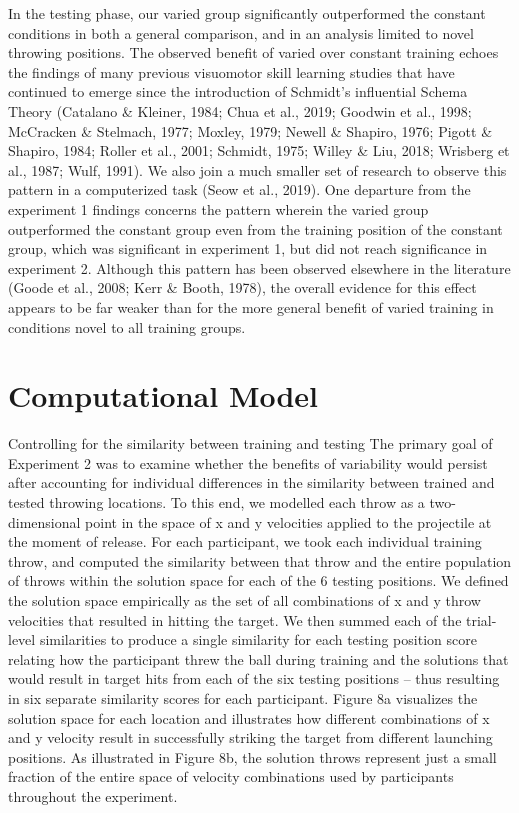 \documentclass[
  man,floatsintext]{apa7}
\begin{document}
In the testing phase, our varied group significantly outperformed the constant conditions in both a general comparison, and in an analysis limited to novel throwing positions. The observed benefit of varied over constant training echoes the findings of many previous visuomotor skill learning studies that have continued to emerge since the introduction of Schmidt's influential Schema Theory (Catalano \& Kleiner, 1984; Chua et al., 2019; Goodwin et al., 1998; McCracken \& Stelmach, 1977; Moxley, 1979; Newell \& Shapiro, 1976; Pigott \& Shapiro, 1984; Roller et al., 2001; Schmidt, 1975; Willey \& Liu, 2018; Wrisberg et al., 1987; Wulf, 1991). We also join a much smaller set of research to observe this pattern in a computerized task (Seow et al., 2019). One departure from the experiment 1 findings concerns the pattern wherein the varied group outperformed the constant group even from the training position of the constant group, which was significant in experiment 1, but did not reach significance in experiment 2. Although this pattern has been observed elsewhere in the literature (Goode et al., 2008; Kerr \& Booth, 1978), the overall evidence for this effect appears to be far weaker than for the more general benefit of varied training in conditions novel to all training groups.

\hypertarget{computational-model}{%
\section{Computational Model}\label{computational-model}}

Controlling for the similarity between training and testing
The primary goal of Experiment 2 was to examine whether the benefits of variability would persist after accounting for individual differences in the similarity between trained and tested throwing locations. To this end, we modelled each throw as a two-dimensional point in the space of x and y velocities applied to the projectile at the moment of release. For each participant, we took each individual training throw, and computed the similarity between that throw and the entire population of throws within the solution space for each of the 6 testing positions. We defined the solution space empirically as the set of all combinations of x and y throw velocities that resulted in hitting the target. We then summed each of the trial-level similarities to produce a single similarity for each testing position score relating how the participant threw the ball during training and the solutions that would result in target hits from each of the six testing positions -- thus resulting in six separate similarity scores for each participant. Figure 8a visualizes the solution space for each location and illustrates how different combinations of x and y velocity result in successfully striking the target from different launching positions. As illustrated in Figure 8b, the solution throws represent just a small fraction of the entire space of velocity combinations used by participants throughout the experiment.
\end{document}
